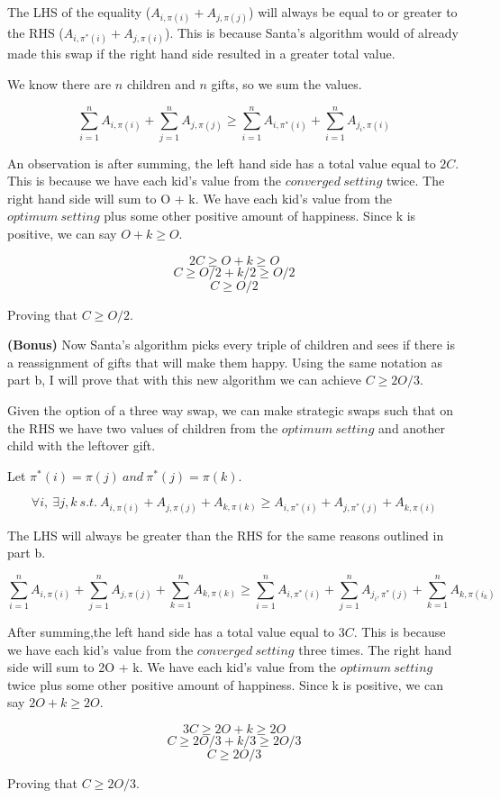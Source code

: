 \documentclass[11pt]{article}
\renewcommand\part[1]{\vspace{.10in}\textbf{(#1)}}
\begin{document}
	The LHS of the equality ($A_{i, \pi(i)} + A_{j, \pi(j)}$) will always be equal to or greater to the RHS ($A_{i, \pi^*(i)} + A_{j, \pi(i)}$). This is because Santa's algorithm would of already made this swap if the right hand side resulted in a greater total value.
	
	We know there are $n$ children and $n$ gifts, so we sum the values.
	
	{\large$$\sum_{i=1}^{n} A_{i, \pi(i)} + \sum_{j=1}^{n} A_{j, \pi(j)} \geq \sum_{i=1}^{n} A_{i, \pi^*(i)} + \sum_{i=1}^{n} A_{j_i, \pi(i)}$$}	
	
	An observation is after summing, the left hand side has a total value equal to $2C$. This is because we have each kid's value from the $converged \ setting$ twice. The right hand side will sum to O + k. We have each kid's value from the $optimum \ setting$ plus some other positive amount of happiness. Since k is positive, we can say $O + k \geq O$.
	
	$$2C \geq O + k \geq O$$
	$$C \geq O/2 + k/2 \geq O/2$$
	$$C \geq O/2$$
	
	Proving that $C \geq O/2$.
	
	\part{Bonus} Now Santa's algorithm picks every triple of children and sees if there is a reassignment of gifts that will make them happy. Using the same notation as part b, I will prove that with this new algorithm we can achieve $C \geq 2O/3$.
	
	Given the option of a three way swap, we can make strategic swaps such that on the RHS we have two values of children from the $optimum \ setting$ and another child with the leftover gift.
	
	Let $\pi^*(i) = \pi(j) \ and \  \pi^*(j) = \pi(k)$.
	 
	{\large $$\forall i, \ \exists j,k \ s.t. \ A_{i, \pi(i)} + A_{j, \pi(j)} + A_{k, \pi(k)} \geq A_{i, \pi^*(i)} + A_{j, \pi^*(j)} + A_{k, \pi(i)}$$}
	
	The LHS will always be greater than the RHS for the same reasons outlined in part b.
	
	{\large$$\sum_{i=1}^{n} A_{i, \pi(i)} + \sum_{j=1}^{n} A_{j, \pi(j)} + \sum_{k=1}^{n} A_{k, \pi(k)} \geq \sum_{i=1}^{n} A_{i, \pi^*(i)} + \sum_{j=1}^{n} A_{j_i, \pi^*(j)} + \sum_{k=1}^{n} A_{k, \pi(i_k)}$$}
	
	After summing,the left hand side has a total value equal to $3C$. This is because we have each kid's value from the $converged \ setting$ three times. The right hand side will sum to 2O + k. We have each kid's value from the $optimum \ setting$ twice plus some other positive amount of happiness. Since k is positive, we can say $2O + k \geq 2O$.
	
		$$3C \geq 2O + k \geq 2O$$
		$$C \geq 2O/3 + k/3 \geq 2O/3$$
		$$C \geq 2O/3$$
		
		Proving that $C \geq 2O/3$.
	 

	 
\end{document}
